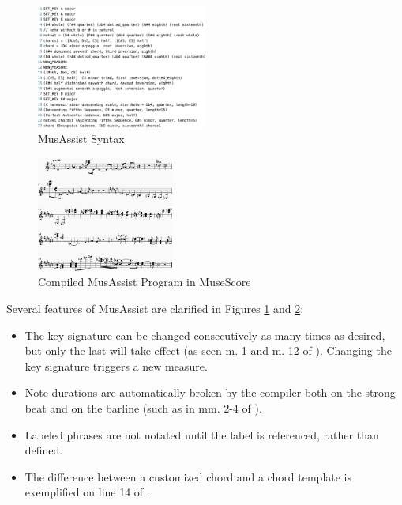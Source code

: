 \documentclass{article}
\begin{document}
\begin{figure}[h!]
\centering
\includegraphics[width=0.5\textwidth]{images/example_program_code}
\caption{MusAssist Syntax}\label{fig:example_program_code}
\end{figure}
\begin{figure}[h!]
\centering
\includegraphics[width=0.4\textwidth]{images/example_program}
\caption{Compiled MusAssist Program in MuseScore}\label{fig:example_program}
\end{figure}
  
Several features of MusAssist are clarified in Figures \ref{fig:example_program_code} and \ref{fig:example_program}:

\begin{itemize}\itemsep0pt
\item The key signature can be changed consecutively as many times as desired, but only the last will take effect (as seen m. 1 and m. 12 of ). Changing the key signature triggers a new measure.
\item Note durations are automatically broken by the compiler both on the strong beat and on the barline (such as in mm. 2-4 of ).
\item Labeled phrases are not notated until the label is referenced, rather than defined.
\item The difference between a customized chord and a chord template is exemplified on line 14 of .
\end{itemize}

\end{document}
